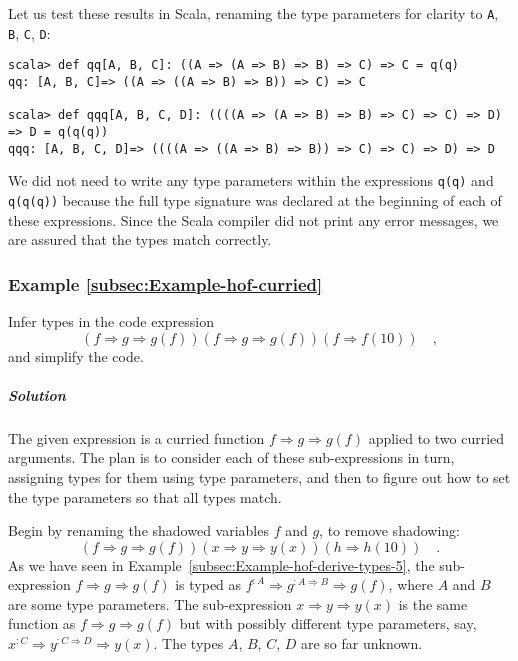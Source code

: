 Let us test these results in Scala, renaming the type parameters for
clarity to \lstinline!A!,
\lstinline!B!, \lstinline!C!,
\lstinline!D!:
\begin{lstlisting}
scala> def qq[A, B, C]: ((A => (A => B) => B) => C) => C = q(q)
qq: [A, B, C]=> ((A => ((A => B) => B)) => C) => C

scala> def qqq[A, B, C, D]: ((((A => (A => B) => B) => C) => C) => D) => D = q(q(q))
qqq: [A, B, C, D]=> ((((A => ((A => B) => B)) => C) => C) => D) => D
\end{lstlisting}
We did not need to write any type parameters within the expressions
\lstinline!q(q)! and \lstinline!q(q(q))!
because the full type signature was declared at the beginning of each
of these expressions. Since the Scala compiler did not print any error
messages, we are assured that the types match correctly.

\subsubsection{Example \label{subsec:Example-hof-curried}\ref{subsec:Example-hof-curried}}

Infer types in the code expression
\[
\left(f\Rightarrow g\Rightarrow g(f)\right)\left(f\Rightarrow g\Rightarrow g(f)\right)\left(f\Rightarrow f(10)\right)\quad,
\]
and simplify the code.

\subparagraph{Solution}

The given expression is a curried function $f\Rightarrow g\Rightarrow g(f)$
applied to two curried arguments. The plan is to consider each of
these sub-expressions in turn, assigning types for them using type
parameters, and then to figure out how to set the type parameters
so that all types match.

Begin by renaming the shadowed variables $f$ and $g$, to remove
shadowing:
\begin{equation}
\left(f\Rightarrow g\Rightarrow g(f)\right)\left(x\Rightarrow y\Rightarrow y(x)\right)\left(h\Rightarrow h(10)\right)\quad.\label{eq:example-hof-curried-function-solved1}
\end{equation}
 As we have seen in Example~\ref{subsec:Example-hof-derive-types-5},
the sub-expression $f\Rightarrow g\Rightarrow g(f)$ is typed as $f^{:A}\Rightarrow g^{:A\Rightarrow B}\Rightarrow g(f)$,
where $A$ and $B$ are some type parameters. The sub-expression $x\Rightarrow y\Rightarrow y(x)$
is the same function as $f\Rightarrow g\Rightarrow g(f)$ but with
possibly different type parameters, say, $x^{:C}\Rightarrow y^{:C\Rightarrow D}\Rightarrow y(x)$.
The types $A$, $B$, $C$, $D$ are so far unknown.

